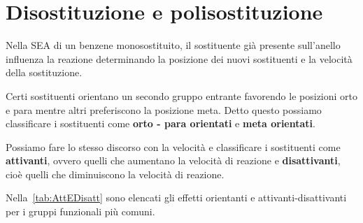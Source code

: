 \section{Disostituzione e polisostituzione}
Nella \ac{SEA} di un benzene monosostituito, il sostituente già presente sull'anello influenza la reazione determinando la posizione dei nuovi sostituenti e la velocità della sostituzione.

Certi sostituenti orientano un secondo gruppo entrante favorendo le posizioni orto e para mentre altri preferiscono la posizione meta. Detto questo possiamo classificare i sostituenti come \textbf{orto - para orientati} e \textbf{meta orientati}.

Possiamo fare lo stesso discorso con la velocità e classificare i sostituenti come \textbf{attivanti}, ovvero quelli che aumentano la velocità di reazione e \textbf{disattivanti}, cioè quelli che diminuiscono la velocità di reazione.

Nella~\autoref{tab:AttEDisatt} sono elencati gli effetti orientanti e attivanti-disattivanti per i gruppi funzionali più comuni.

